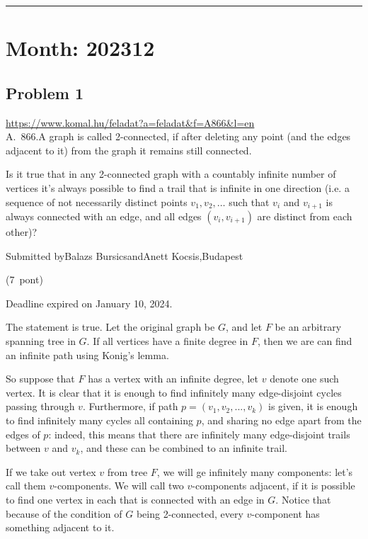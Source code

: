 \documentclass{article}
\begin{document}
\vspace{1em}
\hrule
\vspace{1em}

\section*{Month: 202312}

\subsection*{Problem 1}
\noindent\url{https://www.komal.hu/feladat?a=feladat&f=A866&l=en}\\[1em]

A. 866.A graph is called 2-connected, if after deleting any point (and the edges adjacent to it) from the graph it remains still connected.

Is it true that in any 2-connected graph with a countably infinite number of vertices it's always possible to find a trail that is infinite in one direction (i.e. a sequence of not necessarily distinct points \(\displaystyle v_1, v_2,\ldots\) such that \(\displaystyle v_i\) and \(\displaystyle v_{i+1}\) is always connected with an edge, and all edges \(\displaystyle (v_i,v_{i+1})\) are distinct from each other)?

Submitted byBalazs BursicsandAnett Kocsis,Budapest

(7 pont)

Deadline expired on January 10, 2024.

The statement is true. Let the original graph be \(\displaystyle G\), and let \(\displaystyle F\) be an arbitrary spanning tree in \(\displaystyle G\). If all vertices have a finite degree in \(\displaystyle F\), then we are can find an infinite path using Konig's lemma.

So suppose that \(\displaystyle F\) has a vertex with an infinite degree, let \(\displaystyle v\) denote one such vertex. It is clear that it is enough to find infinitely many edge-disjoint cycles passing through \(\displaystyle v\). Furthermore, if path \(\displaystyle p=(v_1,v_2,...,v_k)\) is given, it is enough to find infinitely many cycles all containing \(\displaystyle p\), and sharing no edge apart from the edges of \(\displaystyle p\): indeed, this means that there are infinitely many edge-disjoint trails between \(\displaystyle v\) and \(\displaystyle v_k\), and these can be combined to an infinite trail.

If we take out vertex \(\displaystyle v\) from tree \(\displaystyle F\), we will ge infinitely many components: let's call them \(\displaystyle v\)-components. We will call two \(\displaystyle v\)-components adjacent, if it is possible to find one vertex in each that is connected with an edge in \(\displaystyle G\). Notice that because of the condition of \(\displaystyle G\) being 2-connected, every \(\displaystyle v\)-component has something adjacent to it.
\end{document}
